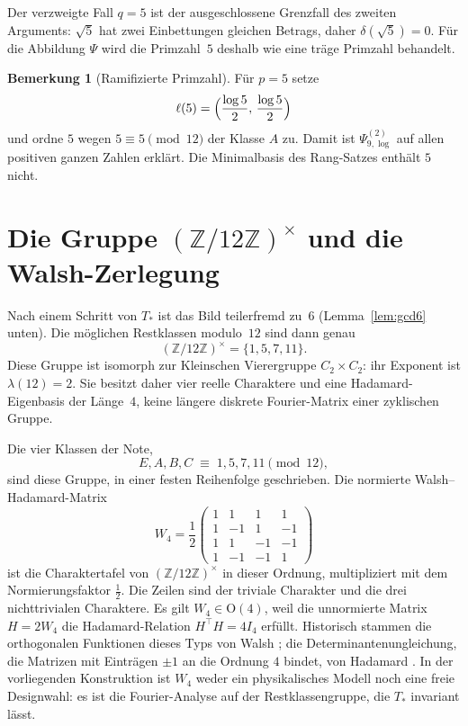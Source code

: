 \documentclass[11pt,a4paper]{article}
\theoremstyle{plain}
\theoremstyle{definition}
\newtheorem{remark}[theorem]{Bemerkung}
\newcommand{\Z}{\mathbb{Z}}
\numberwithin{equation}{section}
\begin{document}
Der verzweigte Fall $q=5$ ist der ausgeschlossene Grenzfall des zweiten
Arguments: $\sqrt{5}$ hat zwei Einbettungen gleichen Betrags, daher
$\delta(\sqrt{5})=0$.
Für die Abbildung $\Psi$ wird die Primzahl~$5$ deshalb wie eine träge Primzahl
behandelt.

\begin{remark}[Ramifizierte Primzahl]
Für $p=5$ setze
\begin{equation}
\ell(5)=\Bigl(\frac{\log 5}{2},\,\frac{\log 5}{2}\Bigr)
\end{equation}
und ordne $5$ wegen $5\equiv 5\pmod{12}$ der Klasse $A$ zu.
Damit ist $\Psi_{9,\log}^{(2)}$ auf allen positiven ganzen Zahlen erklärt.
Die Minimalbasis des Rang-Satzes enthält $5$ nicht.
\end{remark}

\section{Die Gruppe \texorpdfstring{$(\Z/12\Z)^\times$}{(Z/12Z)*}
und die Walsh-Zerlegung}

Nach einem Schritt von $T_*$ ist das Bild teilerfremd zu~$6$
(Lemma~\ref{lem:gcd6} unten).
Die möglichen Restklassen modulo~$12$ sind dann genau
\begin{equation}
(\Z/12\Z)^\times=\{1,5,7,11\}.
\end{equation}
Diese Gruppe ist isomorph zur Kleinschen Vierergruppe $C_2\times C_2$:
ihr Exponent ist $\lambda(12)=2$.
Sie besitzt daher vier reelle Charaktere und eine Hadamard-Eigenbasis der
Länge~$4$, keine längere diskrete Fourier-Matrix einer zyklischen Gruppe.

Die vier Klassen der Note,
\begin{equation}
E,A,B,C \;\equiv\; 1,5,7,11\pmod{12},
\end{equation}
sind diese Gruppe, in einer festen Reihenfolge geschrieben.
Die normierte Walsh--Hadamard-Matrix
\begin{equation}
\label{eq:W4}
W_4=\frac12
\begin{pmatrix}
1&1&1&1\\
1&-1&1&-1\\
1&1&-1&-1\\
1&-1&-1&1
\end{pmatrix}
\end{equation}
ist die Charaktertafel von $(\Z/12\Z)^\times$ in dieser Ordnung, multipliziert
mit dem Normierungsfaktor $\tfrac12$.
Die Zeilen sind der triviale Charakter und die drei nichttrivialen Charaktere.
Es gilt $W_4\in\mathrm{O}(4)$, weil die unnormierte Matrix $H=2W_4$ die
Hadamard-Relation $H^\top H=4I_4$ erfüllt.
Historisch stammen die orthogonalen Funktionen dieses Typs von Walsh
\cite{Walsh1923}; die Determinantenungleichung, die Matrizen mit Einträgen
$\pm 1$ an die Ordnung $4$ bindet, von Hadamard \cite{Hadamard1893}.
In der vorliegenden Konstruktion ist $W_4$ weder ein physikalisches Modell
noch eine freie Designwahl: es ist die Fourier-Analyse auf der
Restklassengruppe, die $T_*$ invariant lässt.
\end{document}
